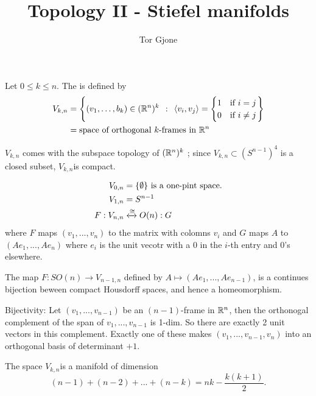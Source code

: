 \documentclass[a4paper,11pt,english]{article}
\title{\textbf{Topology II - Stiefel manifolds}}
\author{Tor Gjone}
\newcommand{\textif}{\text{if }}
\begin{document}
\mmaketitle


Let $0 \le k \le n$. The  is defined by 
\begin{align}
V_{k,n} &= \left\{
(v_1, \dots, b_k) \in (\R^n)^k \q: \<{v_i,v_j} = \begin{cases}1 & \textif i=j \\ 0
& \textif i\ne j \end{cases} \right\} \\
&= \text{space of orthogonal } k\text{-frames in } \R^n 
\end{align}

$V_{k,n}$ comes with the subspace topology of $(\mathbb{R}^n)^k$ ; since
$V_{k,n} \subset (S^{n-1})^4$ is a closed subset, $V_{k,n}$is compact.

\begin{exmp}
\begin{align*}
V_{0,n} &= \{ \emptyset \} \text{ is a one-pint space.} \\
V_{1,n} &= S^{n-1} \\
F: V_{n,n} &\xleftrightarrow{\cong} O(n) : G \\
\end{align*}
where $F$ maps $(v_1, ..., v_n)$ to the matrix with colomns $v_i$ and $G$ maps
$A$ to $(A e_1, ..., A e_n)$ where $e_i$ is the unit vecotr with a $0$ in the
$i$-th entry and $0$'s elsewhere.

The map $F : SO(n) \to V_{n-1,n}$ defined by $A \mapsto (A e_1, ..., A
e_{n-1})$, is a continues bijection beween compact Housdorff spaces, and hence a
homeomorphism.

Bijectivity: Let $(v_1, ..., v_{n-1})$ be an $(n-1)$-frame in $\mathbb{R}^n$, then the
orthonogal complement of the span of $v_1,...,v_{n-1}$ is 1-dim. So there are
exactly 2 unit vectors in this complement. Exactly one of these makes
$(v_1, ... ,v_{n-1},v_n)$ into an orthogonal basis of determinant $+1$.
\end{exmp}
    
\begin{prop}
The space $V_{k,n}$is a manifold of dimension
\[ (n-1) + (n-2) + ... + (n-k) = nk - \frac{k(k+1)}{2}. \]
\end{prop}
\end{document}
